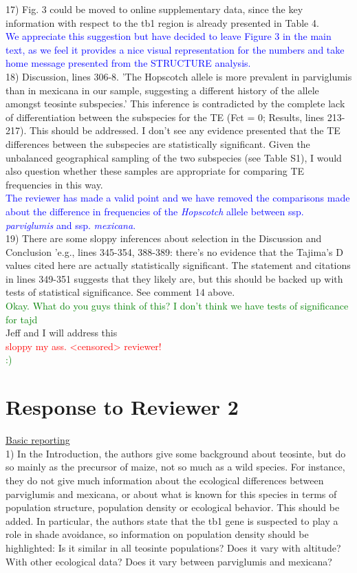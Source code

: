 \documentclass[11pt]{article}
\newcommand{\res}[1]{\noindent \textcolor{blue}{{#1}} \\}
\newcommand{\jri}[1]{\noindent \textcolor{red}{{#1}} \\}
\newcommand{\lev}[1]{\noindent \textcolor{green}{{#1}} \\}
\newcommand{\mbh}[1]{\noindent \textcolor{Dandelion}{{#1}}\\}
\begin{document}
17) Fig. 3 could be moved to online supplementary data, since the key information with respect to the tb1 region is already presented in Table 4. \\

\res{We appreciate this suggestion but have decided to leave Figure 3 in the main text, as we feel it provides a nice visual representation for the numbers and take home message presented from the STRUCTURE analysis.}

18) Discussion, lines 306-8. 'The Hopscotch allele is more prevalent in parviglumis than in mexicana in our sample, suggesting a different history of the allele amongst teosinte subspecies.' This inference is contradicted by the complete lack of differentiation between the subspecies for the TE (Fct = 0; Results, lines 213-217). This should be addressed. I don't see any evidence presented that the TE differences between the subspecies are statistically significant. Given the unbalanced geographical sampling of the two subspecies (see Table S1), I would also question whether these samples are appropriate for comparing TE frequencies in this way. \\

\res{The reviewer has made a valid point and we have removed the comparisons made about the difference in frequencies of the \emph{Hopscotch} allele between ssp. \emph{parviglumis} and ssp. \emph{mexicana}.}

19) There are some sloppy inferences about selection in the Discussion and Conclusion 'e.g., lines 345-354, 388-389: there's no evidence that the Tajima's D values cited here are actually statistically significant. The statement and citations in lines 349-351 suggests that they likely are, but this should be backed up with tests of statistical significance. See comment 14 above.\\

\lev{Okay. What do you guys think of this? I don't think we have tests of significance for tajd}

\mbh{Jeff and I will address this}
\jri{sloppy my ass. <censored> reviewer!}
\lev{ :) }


\section*{Response to Reviewer 2} 

\underline{Basic reporting}\\

1) In the Introduction, the authors give some background about teosinte, but do so mainly as the precursor of maize, not so much as a wild species. For instance, they do not give much information about the ecological differences between parviglumis and mexicana, or about what is known for this species in terms of population structure, population density or ecological behavior. This should be added. In particular, the authors state that the tb1 gene is suspected to play a role in shade avoidance, so information on population density should be highlighted: Is it similar in all teosinte populations? Does it vary with altitude? With other ecological data? Does it vary between parviglumis and mexicana?\\
\end{document}
